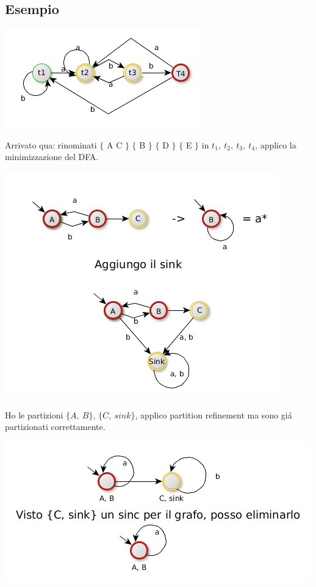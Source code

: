 \subsection{Esempio}

\begin{center}
	\includegraphics[scale=0.5]{Chapters/Img/c02_06.png}\\
\end{center} 
Arrivato qua: rinominati $\{$ A C $\}$ $\{$ B $\}$ $\{$ D $\}$ $\{$ E $\}$ in $t_1,\ t_2,\ t_3,\ t_4 $,
applico la minimizzazione del DFA.

\begin{center}
	\includegraphics[scale=0.5]{Chapters/Img/c02_07.png}\\
\end{center} 

Ho le partizioni $\{A,\ B\}$, $\{C,\ sink\}$, applico partition refinement ma sono gi\'a partizionati correttamente.

\begin{center}
	\includegraphics[scale=0.5]{Chapters/Img/c02_08.png}\\
\end{center} 

